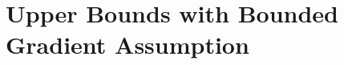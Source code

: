 \documentclass{osudissert96}
\begin{document}
%





\section{Upper Bounds with Bounded Gradient Assumption} \label{sec:upper_gBscss}
\end{document}
